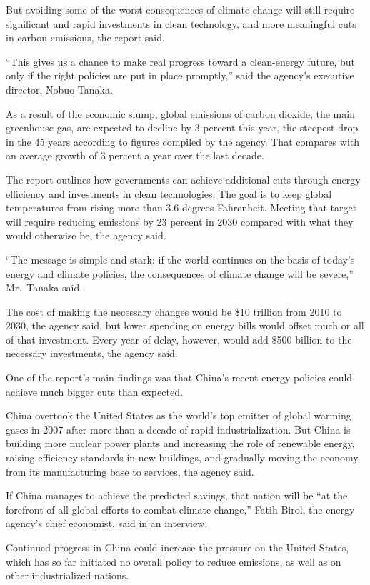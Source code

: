 ﻿\documentclass[12pt]{article}
\begin{document}
But avoiding some of the worst consequences of climate change will still require significant and
rapid investments in clean technology, and more meaningful cuts in carbon emissions, the report
said.

``This gives us a chance to make real progress toward a clean-energy future, but only if the right
policies are put in place promptly,'' said the agency's executive director, Nobuo Tanaka.

As a result of the economic slump, global emissions of carbon dioxide, the main greenhouse gas, are
expected to decline by 3 percent this year, the steepest drop in the 45 years according to figures
compiled by the agency. That compares with an average growth of 3 percent a year over the last
decade.

The report outlines how governments can achieve additional cuts through energy efficiency and
investments in clean technologies. The goal is to keep global temperatures from rising more than 3.6
degrees Fahrenheit. Meeting that target will require reducing emissions by 23 percent in 2030
compared with what they would otherwise be, the agency said.

``The message is simple and stark: if the world continues on the basis of today's energy and climate
policies, the consequences of climate change will be severe,'' Mr.~Tanaka said.

The cost of making the necessary changes would be \$10 trillion from 2010 to 2030, the agency said,
but lower spending on energy bills would offset much or all of that investment. Every year of delay,
however, would add \$500 billion to the necessary investments, the agency said.

One of the report's main findings was that China's recent energy policies could achieve much bigger
cuts than expected.

China overtook the United States as the world's top emitter of global warming gases in 2007 after
more than a decade of rapid industrialization. But China is building more nuclear power plants and
increasing the role of renewable energy, raising efficiency standards in new buildings, and
gradually moving the economy from its manufacturing base to services, the agency said.

If China manages to achieve the predicted savings, that nation will be ``at the forefront of all
global efforts to combat climate change,'' Fatih Birol, the energy agency's chief economist, said in
an interview.

Continued progress in China could increase the pressure on the United States, which has so far
initiated no overall policy to reduce emissions, as well as on other industrialized nations.
\end{document}
